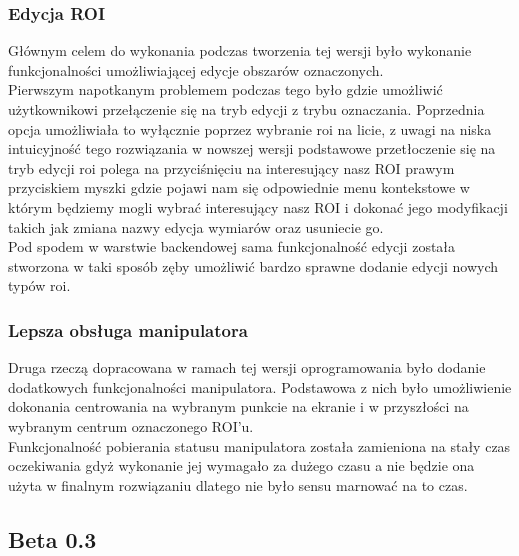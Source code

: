 \documentclass[11pt,a4paper]{article}
\begin{document}
    \subsubsection{Edycja ROI}
    \hspace{1cm} Głównym celem do wykonania podczas tworzenia tej wersji było wykonanie funkcjonalności umożliwiającej edycje obszarów oznaczonych. \\
    \hspace{1cm} Pierwszym napotkanym problemem podczas tego było gdzie umożliwić użytkownikowi przełączenie się na tryb edycji z trybu oznaczania. Poprzednia opcja umożliwiała to wyłącznie poprzez wybranie roi na licie, z uwagi na niska intuicyjność tego rozwiązania w nowszej wersji podstawowe przetłoczenie się na tryb edycji roi polega na przyciśnięciu na interesujący nasz ROI prawym przyciskiem myszki gdzie pojawi nam się odpowiednie menu kontekstowe w którym będziemy mogli wybrać interesujący nasz ROI i dokonać jego modyfikacji takich jak zmiana nazwy edycja wymiarów oraz usuniecie go. \\
    \hspace{1cm} Pod spodem w warstwie backendowej sama funkcjonalność edycji została stworzona w taki sposób zęby umożliwić bardzo sprawne dodanie edycji nowych typów roi.\\

    \subsubsection{Lepsza obsługa manipulatora}
    \hspace{1cm} Druga rzeczą dopracowana w ramach tej wersji oprogramowania było dodanie dodatkowych funkcjonalności manipulatora. Podstawowa z nich było umożliwienie dokonania centrowania na wybranym punkcie na ekranie i w przyszłości na wybranym centrum oznaczonego ROI'u.\\
    \hspace{1cm} Funkcjonalność pobierania statusu manipulatora została zamieniona na stały czas oczekiwania gdyż wykonanie jej wymagało za dużego czasu a nie będzie ona użyta w finalnym rozwiązaniu dlatego nie było sensu marnować na to czas.

    \subsection{Beta 0.3}
\end{document}
